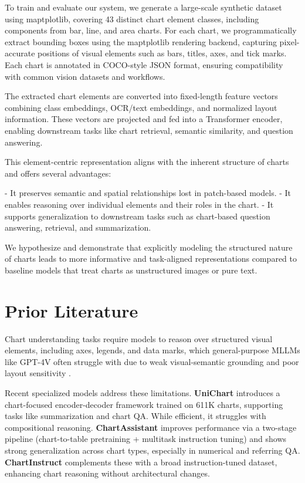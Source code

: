 \documentclass[11pt]{article}
\begin{document}
To train and evaluate our system, we generate a large-scale synthetic dataset using maptplotlib, covering 43 distinct chart element classes, including components from bar, line, and area charts. For each chart, we programmatically extract bounding boxes using the maptplotlib rendering backend, capturing pixel-accurate positions of visual elements such as bars, titles, axes, and tick marks. Each chart is annotated in COCO-style JSON format, ensuring compatibility with common vision datasets and workflows.

The extracted chart elements are converted into fixed-length feature vectors combining class embeddings, OCR/text embeddings, and normalized layout information. These vectors are projected and fed into a Transformer encoder, enabling downstream tasks like chart retrieval, semantic similarity, and question answering.

This element-centric representation aligns with the inherent structure of charts and offers several advantages:

- It preserves semantic and spatial relationships lost in patch-based models.
- It enables reasoning over individual elements and their roles in the chart.
- It supports generalization to downstream tasks such as chart-based question answering, retrieval, and summarization.

We hypothesize and demonstrate that explicitly modeling the structured nature of charts leads to more informative and task-aligned representations compared to baseline models that treat charts as unstructured images or pure text.

\section{Prior Literature}

Chart understanding tasks require models to reason over structured visual elements, including axes, legends, and data marks, which general-purpose MLLMs like GPT-4V often struggle with due to weak visual-semantic grounding and poor layout sensitivity \cite{li2024visualizationliteracy, huang2024survey}.

Recent specialized models address these limitations. \textbf{UniChart} \cite{masry2023unichart} introduces a chart-focused encoder-decoder framework trained on 611K charts, supporting tasks like summarization and chart QA. While efficient, it struggles with compositional reasoning. \textbf{ChartAssistant} \cite{zhang2024chartassistant} improves performance via a two-stage pipeline (chart-to-table pretraining + multitask instruction tuning) and shows strong generalization across chart types, especially in numerical and referring QA. \textbf{ChartInstruct} \cite{lin2024chartinstruct} complements these with a broad instruction-tuned dataset, enhancing chart reasoning without architectural changes.
\end{document}
